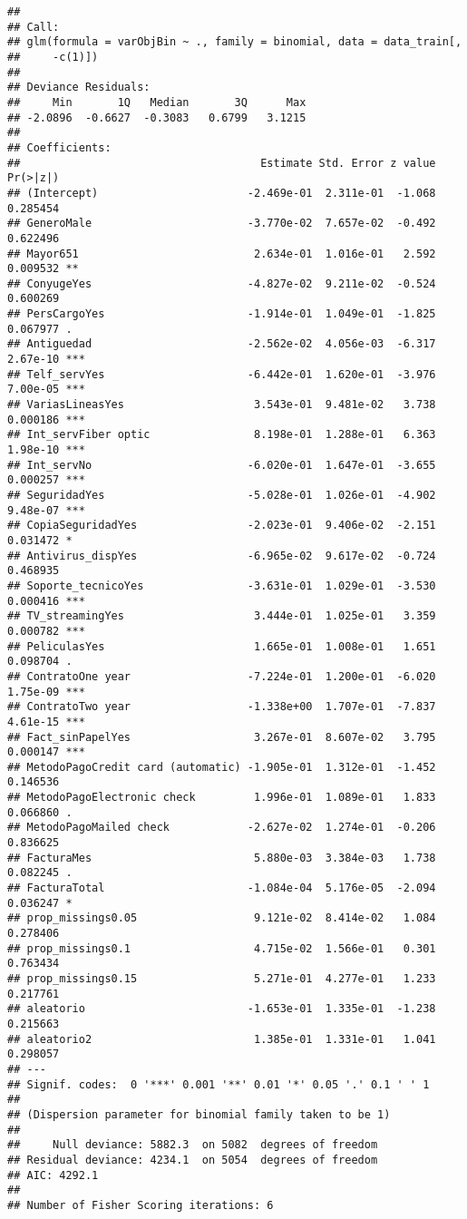 \documentclass[
]{article}
\begin{document}
\begin{verbatim}
## 
## Call:
## glm(formula = varObjBin ~ ., family = binomial, data = data_train[, 
##     -c(1)])
## 
## Deviance Residuals: 
##     Min       1Q   Median       3Q      Max  
## -2.0896  -0.6627  -0.3083   0.6799   3.1215  
## 
## Coefficients:
##                                     Estimate Std. Error z value Pr(>|z|)    
## (Intercept)                       -2.469e-01  2.311e-01  -1.068 0.285454    
## GeneroMale                        -3.770e-02  7.657e-02  -0.492 0.622496    
## Mayor651                           2.634e-01  1.016e-01   2.592 0.009532 ** 
## ConyugeYes                        -4.827e-02  9.211e-02  -0.524 0.600269    
## PersCargoYes                      -1.914e-01  1.049e-01  -1.825 0.067977 .  
## Antiguedad                        -2.562e-02  4.056e-03  -6.317 2.67e-10 ***
## Telf_servYes                      -6.442e-01  1.620e-01  -3.976 7.00e-05 ***
## VariasLineasYes                    3.543e-01  9.481e-02   3.738 0.000186 ***
## Int_servFiber optic                8.198e-01  1.288e-01   6.363 1.98e-10 ***
## Int_servNo                        -6.020e-01  1.647e-01  -3.655 0.000257 ***
## SeguridadYes                      -5.028e-01  1.026e-01  -4.902 9.48e-07 ***
## CopiaSeguridadYes                 -2.023e-01  9.406e-02  -2.151 0.031472 *  
## Antivirus_dispYes                 -6.965e-02  9.617e-02  -0.724 0.468935    
## Soporte_tecnicoYes                -3.631e-01  1.029e-01  -3.530 0.000416 ***
## TV_streamingYes                    3.444e-01  1.025e-01   3.359 0.000782 ***
## PeliculasYes                       1.665e-01  1.008e-01   1.651 0.098704 .  
## ContratoOne year                  -7.224e-01  1.200e-01  -6.020 1.75e-09 ***
## ContratoTwo year                  -1.338e+00  1.707e-01  -7.837 4.61e-15 ***
## Fact_sinPapelYes                   3.267e-01  8.607e-02   3.795 0.000147 ***
## MetodoPagoCredit card (automatic) -1.905e-01  1.312e-01  -1.452 0.146536    
## MetodoPagoElectronic check         1.996e-01  1.089e-01   1.833 0.066860 .  
## MetodoPagoMailed check            -2.627e-02  1.274e-01  -0.206 0.836625    
## FacturaMes                         5.880e-03  3.384e-03   1.738 0.082245 .  
## FacturaTotal                      -1.084e-04  5.176e-05  -2.094 0.036247 *  
## prop_missings0.05                  9.121e-02  8.414e-02   1.084 0.278406    
## prop_missings0.1                   4.715e-02  1.566e-01   0.301 0.763434    
## prop_missings0.15                  5.271e-01  4.277e-01   1.233 0.217761    
## aleatorio                         -1.653e-01  1.335e-01  -1.238 0.215663    
## aleatorio2                         1.385e-01  1.331e-01   1.041 0.298057    
## ---
## Signif. codes:  0 '***' 0.001 '**' 0.01 '*' 0.05 '.' 0.1 ' ' 1
## 
## (Dispersion parameter for binomial family taken to be 1)
## 
##     Null deviance: 5882.3  on 5082  degrees of freedom
## Residual deviance: 4234.1  on 5054  degrees of freedom
## AIC: 4292.1
## 
## Number of Fisher Scoring iterations: 6
\end{verbatim}
\end{document}
